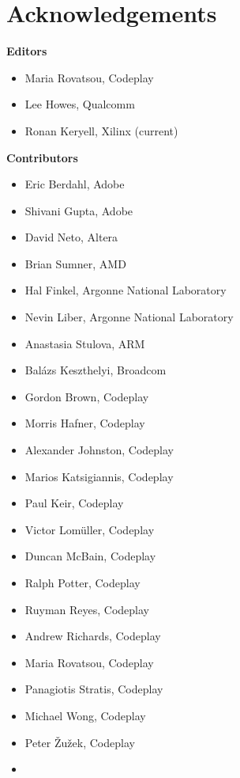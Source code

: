 \chapter{Acknowledgements}

\noindent\textbf{Editors}

\begin{itemize}
\item Maria Rovatsou, Codeplay
\item Lee Howes, Qualcomm
\item Ronan Keryell, Xilinx (current)
\end{itemize}


\noindent\textbf{Contributors}

\begin{multicols}{2}
\begin{itemize}
\item
    Eric Berdahl, Adobe
\item
    Shivani Gupta, Adobe
\item
    David Neto, Altera
\item
    Brian Sumner, AMD
\item
    Hal Finkel, Argonne National Laboratory
\item
    Nevin Liber, Argonne National Laboratory
\item
    Anastasia Stulova, ARM
\item
    Bal\'azs Keszthelyi, Broadcom
\item
    Gordon Brown, Codeplay
\item
    Morris Hafner, Codeplay
\item
    Alexander Johnston, Codeplay
\item
    Marios Katsigiannis, Codeplay
\item
    Paul Keir, Codeplay
\item
    Victor Lom\"uller, Codeplay
\item
    Duncan McBain, Codeplay
\item
    Ralph Potter, Codeplay
\item
    Ruyman Reyes, Codeplay
\item
    Andrew Richards, Codeplay
\item
    Maria Rovatsou, Codeplay
\item
    Panagiotis Stratis, Codeplay
\item
    Michael Wong, Codeplay
\item
    Peter {\v Z}u{\v z}ek, Codeplay
\item

\end{itemize}
\end{multicols}
